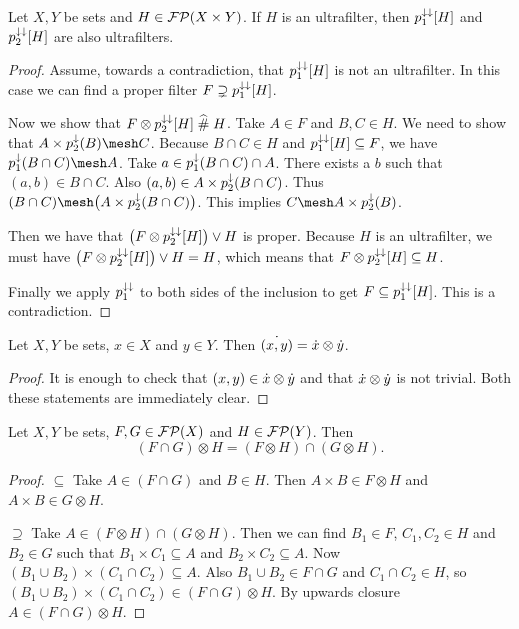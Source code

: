 \begin{lemma} \label{projectionsOfUltrafilterAreUltra}
Let $X,Y$ be sets and $H \in \operatorname{\mathcal{FP}}(X\times Y)$. If $H$ is an ultrafilter, then $p_1^{\downarrow\downarrow}[H]$ and $p_2^{\downarrow\downarrow}[H]$ are also ultrafilters.
\end{lemma}
\begin{proof}
Assume, towards a contradiction, that $p_1^{\downarrow\downarrow}[H]$ is not an ultrafilter. In this case we can find a proper filter $F\supsetneq p_1^{\downarrow\downarrow}[H]$.

Now we show that $F\otimes p_2^{\downarrow\downarrow}[H] \mathrel{\widehat{\#}} H$.
Take $A\in F$ and $B, C\in H$. We need to show that $A\times p_2^{\imf}(B) \mesh C$. Because $B\cap C\in H$ and $p_1^{\downarrow\downarrow}[H]\subseteq F$, we have $p_1^\imf(B\cap C)\mesh A$. Take $a\in p_1^\downarrow(B\cap C)\cap A$. There exists a $b$ such that $(a,b)\in B\cap C$. Also $(a,b) \in A\times p_2^\downarrow(B\cap C)$. Thus $(B\cap C) \mesh \big(A\times p_2^\imf(B\cap C)\big)$. This implies $C \mesh A\times p_2^{\imf}(B)$.

Then we have that $\big(F\otimes p_2^{\downarrow\downarrow}[H]\big)\vee H$ is proper. Because $H$ is an ultrafilter, we must have $\big(F\otimes p_2^{\downarrow\downarrow}[H]\big)\vee H = H$, which means that $F\otimes p_2^{\downarrow\downarrow}[H] \subseteq H$.

Finally we apply $p_1^{\downarrow\downarrow}$ to both sides of the inclusion to get $F \subseteq p_1^{\downarrow\downarrow}[H]$. This is a contradiction.
\end{proof}

\begin{lemma} \label{productPrincipalUltrafilter}
Let $X,Y$ be sets, $x\in X$ and $y\in Y$. Then $\dot{(x,y)} = \dot{x} \otimes \dot{y}$.
\end{lemma}
\begin{proof}
It is enough to check that $(x,y)\in\dot{x}\otimes\dot{y}$ and that $\dot{x}\otimes\dot{y}$ is not trivial. Both these statements are immediately clear.
\end{proof}

\begin{lemma} \label{intersectionProductFilters}
Let $X,Y$ be sets, $F,G\in \operatorname{\mathcal{FP}}(X)$ and $H\in\operatorname{\mathcal{FP}}(Y)$. Then
\[ (F\cap G)\otimes H = (F\otimes H)\cap (G\otimes H). \]
\end{lemma}
\begin{proof}
$\boxed{\subseteq}$ Take $A\in (F\cap G)$ and $B\in H$. Then $A\times B\in F\otimes H$ and $A\times B\in G\otimes H$.

$\boxed{\supseteq}$ Take $A \in (F\otimes H)\cap (G\otimes H)$. Then we can find $B_1\in F$, $C_1,C_2\in H$ and $B_2\in G$ such that $B_1\times C_1 \subseteq A$ and $B_2\times C_2 \subseteq A$. Now $(B_1\cup B_2)\times (C_1\cap C_2) \subseteq A$. Also $B_1\cup B_2 \in F\cap G$ and $C_1\cap C_2 \in H$, so $(B_1\cup B_2)\times (C_1\cap C_2) \in (F\cap G)\otimes H$. By upwards closure $A\in (F\cap G)\otimes H$.
\end{proof}

